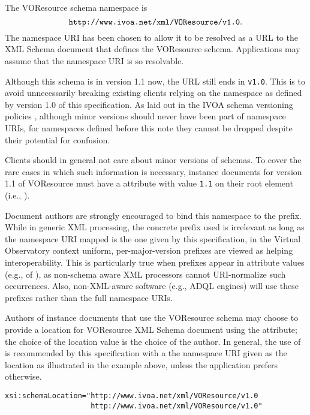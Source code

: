 \documentclass[11pt,a4paper]{ivoa}
\begin{document}
\label{sect:namespace}


The VOResource schema namespace is 
$$\hbox{\texttt{http://www.ivoa.net/xml/VOResource/v1.0}}.$$
The namespace URI has been chosen to allow it to be resolved as a URL
to the XML Schema document that defines the VOResource schema.
Applications may assume that the namespace URI is so resolvable.

Although this schema is in version 1.1 now, the URL still ends in
\texttt{v1.0}.  This is to avoid unnecessarily breaking existing clients
relying on the namespace as defined by version 1.0 of this
specification.  As laid out in the IVOA schema versioning policies
\citep{note:schemaevolution}, although minor versions should never have
been part of namespace URIs, for namespaces defined before this note
they cannot be dropped despite their potential for confusion.

Clients should in general not care about minor versions of schemas.
To cover
the rare cases in which  such information is necessary, instance documents
for version 1.1 of VOResource must have a  attribute
with value \texttt{1.1} on their root element (i.e., ).

Document authors are strongly encouraged to bind this namespace to the
 prefix.  While in generic XML processing, the concrete
prefix used is irrelevant as long as the namespace URI mapped is the one
given by this specification, in the Virtual Observatory context uniform,
per-major-version prefixes are viewed as helping interoperability.  This
is particularly true when prefixes appear in attribute values (e.g.,
of ), as non-schema aware XML processors cannot
URI-normalize such occurrences.  Also, non-XML-aware software (e.g., ADQL
engines) will use these prefixes rather than the full namespace URIs.

Authors of instance documents that use the VOResource schema may choose
to provide a location for VOResource XML Schema document using the
 attribute; the choice of the location value
is the choice of the author.  In general, the use of
 is recommended by this specification with
a the namespace URI given as the location as illustrated in the example
above, unless the application prefers otherwise.


\begin{verbatim}
xsi:schemaLocation="http://www.ivoa.net/xml/VOResource/v1.0
                    http://www.ivoa.net/xml/VOResource/v1.0"
\end{verbatim}
\end{document}
